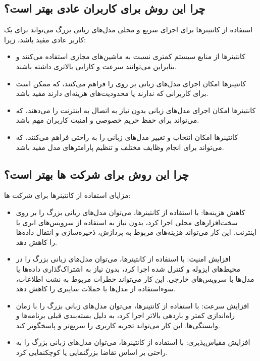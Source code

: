 \subsection{چرا این روش برای کاربران عادی بهتر است؟}
استفاده از کانتینرها برای اجرای سریع و محلی مدل‌های زبانی بزرگ می‌تواند برای یک کاربر عادی مفید باشد، زیرا:
\begin{itemize}
  \item 

کانتینرها از منابع سیستم کمتری نسبت به ماشین‌های مجازی استفاده می‌کنند و بنابراین می‌توانند سرعت و کارایی بالاتری داشته باشند.
  \item 

کانتینرها امکان اجرای مدل‌های زبانی بر روی  را فراهم می‌کنند، که ممکن است برای کاربرانی که  ندارند یا محدودیت‌های هزینه‌ای دارند مفید باشد.
\item 

کانتینرها امکان اجرای مدل‌های زبانی بدون نیاز به اتصال به اینترنت را می‌دهند، که می‌تواند برای حفظ حریم خصوصی و امنیت کاربران مهم باشد.
\item 

کانتینرها امکان انتخاب و تغییر مدل‌های زبانی را به راحتی فراهم می‌کنند، که می‌تواند برای انجام وظایف مختلف و تنظیم پارامترهای مدل مفید باشد.
\end{itemize}

\subsection{چرا این روش برای شرکت ها بهتر است؟}
مزایای استفاده از کانتینرها برای شرکت ها:
\begin{itemize}
\item 
کاهش هزینه‌ها: با استفاده از کانتینرها، می‌توان مدل‌های زبانی بزرگ را بر روی سخت‌افزارهای محلی اجرا کرد، بدون نیاز به استفاده از سرویس‌های ابری یا اینترنت. این کار می‌تواند هزینه‌های مربوط به پردازش، ذخیره‌سازی و انتقال داده‌ها را کاهش دهد.
\item 
افزایش امنیت: با استفاده از کانتینرها، می‌توان مدل‌های زبانی بزرگ را در محیط‌های ایزوله و کنترل شده اجرا کرد، بدون نیاز به اشتراک‌گذاری داده‌ها یا مدل‌ها با سرویس‌های خارجی. این کار می‌تواند خطرات مربوط به نشت اطلاعات، سوءاستفاده از مدل‌ها یا حملات سایبری را کاهش دهد.
\item 
افزایش سرعت: با استفاده از کانتینرها، می‌توان مدل‌های زبانی بزرگ را با زمان راه‌اندازی کمتر و بازدهی بالاتر اجرا کرد، به دلیل بسته‌بندی قبلی برنامه‌ها و وابستگی‌ها. این کار می‌تواند تجربه کاربری را سریع‌تر و پاسخگوتر کند.
\item 
افزایش مقیاس‌پذیری: با استفاده از کانتینرها، می‌توان مدل‌های زبانی بزرگ را به راحتی بر اساس تقاضا بزرگنمایی یا کوچکنمایی کرد.
\end{itemize}
